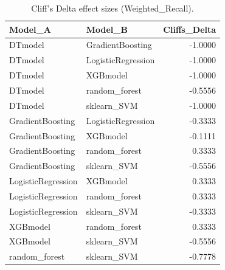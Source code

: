 \begin{table}[t]
\centering
\begin{tabular}{llr}
\toprule
Model_A & Model_B & Cliffs_Delta \\
\midrule
DTmodel & GradientBoosting & -1.0000 \\
DTmodel & LogisticRegression & -1.0000 \\
DTmodel & XGBmodel & -1.0000 \\
DTmodel & random_forest & -0.5556 \\
DTmodel & sklearn_SVM & -1.0000 \\
GradientBoosting & LogisticRegression & -0.3333 \\
GradientBoosting & XGBmodel & -0.1111 \\
GradientBoosting & random_forest & 0.3333 \\
GradientBoosting & sklearn_SVM & -0.5556 \\
LogisticRegression & XGBmodel & 0.3333 \\
LogisticRegression & random_forest & 0.3333 \\
LogisticRegression & sklearn_SVM & -0.3333 \\
XGBmodel & random_forest & 0.3333 \\
XGBmodel & sklearn_SVM & -0.5556 \\
random_forest & sklearn_SVM & -0.7778 \\
\bottomrule
\end{tabular}
\caption{Cliff's Delta effect sizes (Weighted_Recall).}
\label{tab:cliffs_Weighted_Recall}
\end{table}